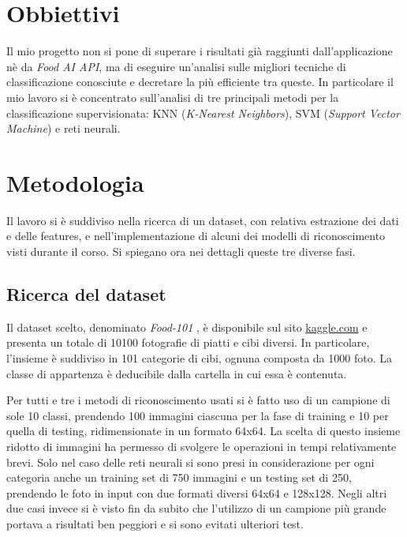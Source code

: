\documentclass[11pt, a4paper, titlepage]{article}
\begin{document}
\section{Obbiettivi}
Il mio progetto non si pone di superare i risultati già raggiunti dall'applicazione nè da \textit{Food AI API}, ma di eseguire un'analisi sulle migliori tecniche di classificazione conosciute e decretare la più efficiente tra queste. In particolare il mio lavoro si è concentrato sull'analisi di tre principali metodi per la classificazione supervisionata: KNN (\textit{K-Nearest Neighbors}), SVM (\textit{Support Vector Machine}) e reti neurali. 

\pagebreak

\section{Metodologia}
Il lavoro si è suddiviso nella ricerca di un dataset, con relativa estrazione dei dati e delle features, e nell'implementazione di alcuni dei modelli di riconoscimento visti durante il corso. Si spiegano ora nei dettagli queste tre diverse fasi. 

\subsection{Ricerca del dataset}
Il dataset scelto, denominato \emph{Food-101} \cite{food-101}, è disponibile sul sito \href{https://www.kaggle.com/kmader/food41}{kaggle.com} e presenta un totale di 10100 fotografie di piatti e cibi diversi. In particolare, l'insieme è suddiviso in 101 categorie di cibi, ognuna composta da 1000 foto. La classe di appartenza è deducibile dalla cartella in cui essa è contenuta. 

Per tutti e tre i metodi di riconoscimento usati si è fatto uso di un campione di sole 10 classi, prendendo 100 immagini ciascuna per la fase di training e 10 per quella di testing, ridimensionate in un formato 64x64. La scelta di questo insieme ridotto di immagini ha permesso di svolgere le operazioni in tempi relativamente brevi. Solo nel caso delle reti neurali si sono presi in considerazione per ogni categoria anche un training set di 750 immagini e un testing set di 250, prendendo le foto in input con due formati diversi 64x64 e 128x128. Negli altri due casi invece si è visto fin da subito che l'utilizzo di un campione più grande portava a risultati ben peggiori e si sono evitati ulteriori test. 
\end{document}
